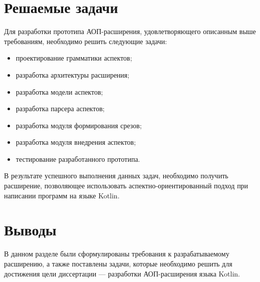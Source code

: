 \section{Решаемые задачи}
\label{sec:tasks}
Для разработки прототипа АОП-расширения, удовлетворяющего описанным выше требованиям, необходимо решить следующие задачи:
\begin{itemize}
    \item проектирование грамматики аспектов;
    \item разработка архитектуры расширения;
    \item разработка модели аспектов;
    \item разработка парсера аспектов;
    \item разработка модуля формирования срезов;
    \item разработка модуля внедрения аспектов;
    \item тестирование разработанного прототипа.
\end{itemize}

В результате успешного выполнения данных задач, необходимо получить расширение, позволяющее использовать аспектно-ориентированный подход при написании программ на языке Kotlin.
\section{Выводы}
В данном разделе были сформулированы требования к разрабатываемому расширению, а также поставлены задачи, которые необходимо решить для достижения цели диссертации --- разработки АОП-расширения языка Kotlin.